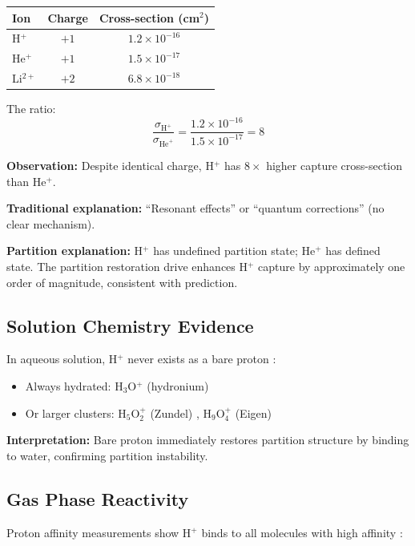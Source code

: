 \documentclass[twocolumn,10pt,a4paper]{article}
\theoremstyle{definition}
\theoremstyle{remark}
\begin{document}
\begin{center}
\begin{tabular}{lcc}
\toprule
Ion & Charge & Cross-section (cm$^2$) \\
\midrule
H$^+$ & $+1$ & $1.2 \times 10^{-16}$ \\
He$^+$ & $+1$ & $1.5 \times 10^{-17}$ \\
Li$^{2+}$ & $+2$ & $6.8 \times 10^{-18}$ \\
\bottomrule
\end{tabular}
\end{center}

The ratio:
\begin{equation}
    \frac{\sigma_{\text{H}^+}}{\sigma_{\text{He}^+}} = \frac{1.2 \times 10^{-16}}{1.5 \times 10^{-17}} = 8
\end{equation}

\textbf{Observation:} Despite identical charge, H$^+$ has $8\times$ higher capture cross-section than He$^+$.

\textbf{Traditional explanation:} ``Resonant effects'' or ``quantum corrections'' (no clear mechanism).

\textbf{Partition explanation:} H$^+$ has undefined partition state; He$^+$ has defined state. The partition restoration drive enhances H$^+$ capture by approximately one order of magnitude, consistent with prediction.

\subsection{Solution Chemistry Evidence}

In aqueous solution, H$^+$ never exists as a bare proton \cite{marx2006}:
\begin{itemize}
    \item Always hydrated: H$_3$O$^+$ (hydronium)
    \item Or larger clusters: H$_5$O$_2^+$ (Zundel) \cite{zundel1968}, H$_9$O$_4^+$ (Eigen) \cite{eigen1964}
\end{itemize}

\textbf{Interpretation:} Bare proton immediately restores partition structure by binding to water, confirming partition instability.

\subsection{Gas Phase Reactivity}

Proton affinity measurements show H$^+$ binds to all molecules with high affinity \cite{hunter1998}:
\end{document}
